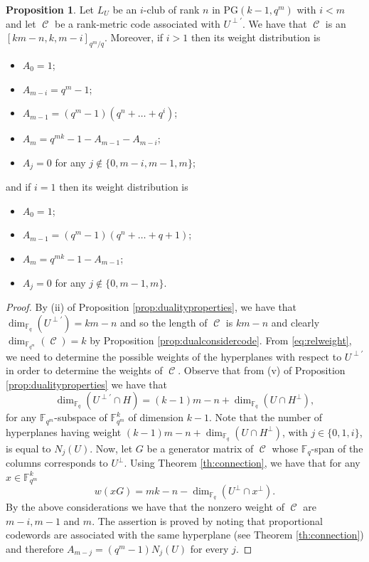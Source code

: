 \documentclass[11pt]{amsart}
\DeclareMathOperator{\C}{\mathcal{C}}
\theoremstyle{definition}
\newtheorem{proposition}[theorem]{Proposition}
\newcommand{\F}{{\mathbb F}}
\newcommand{\fq}{{\mathbb F}_{q}}
\begin{document}
\begin{proposition}\label{prop:codeparam}
    Let $L_U$ be an $i$-club of rank $n$ in PG$(k-1,q^m)$ with $i<m$ and let $\C$ be a rank-metric code associated with $U^{\perp'}$. We have that $\C$ is an $[km-n,k,m-i]_{q^m/q}$. Moreover, if $i>1$ then its weight distribution is
    \begin{itemize}
        \item $A_0=1$;
        \item $A_{m-i}=q^m-1$;
        \item $A_{m-1}=(q^m-1)(q^n+\ldots+q^i)$;
        \item $A_m=q^{mk}-1-A_{m-1}-A_{m-i}$;
        \item $A_j=0$ for any $j \notin\{0,m-i,m-1,m\}$;
    \end{itemize}
    and if $i=1$ then its weight distribution is
    \begin{itemize}
        \item $A_0=1$;
        \item $A_{m-1}=(q^m-1)(q^n+\ldots+q+1)$;
        \item $A_m=q^{mk}-1-A_{m-1}$;
        \item $A_j=0$ for any $j \notin\{0,m-1,m\}$.
    \end{itemize}
\end{proposition}
\begin{proof}
    By (ii) of Proposition \ref{prop:dualityproperties}, we have that $\dim_{\fq}(U^{\perp'})=km-n$ and so the length of $\C$ is $km-n$ and clearly $\dim_{\F_{q^m}}(\C)=k$ by Proposition \ref{prop:dualconsidercode}. 
    From \eqref{eq:relweight}, we need to determine the possible weights of the hyperplanes with respect to $U^{\perp'}$ in order to determine the weights of $\C$.
    Observe that from (v) of Proposition \ref{prop:dualityproperties} we have that
    \[ \dim_{\F_q}(U^{\perp'}\cap H)=(k-1)m-n+\dim_{\fq}(U\cap H^\perp), \]
    for any $\F_{q^m}$-subspace of $\F_{q^m}^k$ of dimension $k-1$.
    Note that the number of hyperplanes having weight $(k-1)m-n+\dim_{\fq}(U\cap H^\perp)$, with $j \in \{0,1,i\}$, is equal to $N_j(U)$.
    Now, let $G$ be a generator matrix of $\C$ whose $\fq$-span of the columns corresponds to $U^\perp$.
    Using Theorem \ref{th:connection}, we have that for any $x \in \F_{q^m}^k$
    \[w(xG)=mk-n-\dim_{\fq}(U^\perp \cap x^\perp).\]
    By the above considerations we have that the nonzero weight of $\C$ are $m-i,m-1$ and $m$.
    The assertion is proved by noting that proportional codewords are associated with the same hyperplane (see Theorem \ref{th:connection}) and therefore $A_{m-j}=(q^m-1)N_j(U)$ for every $j$.
\end{proof}
\end{document}
